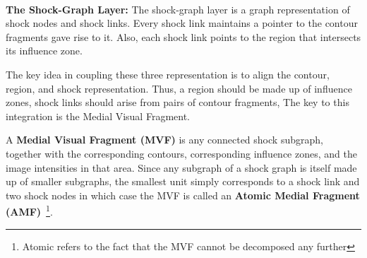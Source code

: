 \noindent\\
{\bf  The Shock-Graph Layer: } The shock-graph layer is a graph representation of shock nodes and shock links. Every shock link maintains a pointer to the contour fragments gave rise to it. Also, each shock link points to the region that intersects its influence zone. 

The key idea in coupling these three representation is to align the contour, region, and shock representation. Thus, a region should be made up of influence zones, shock links should arise from pairs of contour fragments, \etc The key to this integration is the Medial Visual Fragment.

\begin{definition}
A {\bf Medial Visual Fragment (MVF)} is any connected shock subgraph, together with the corresponding contours, corresponding influence zones, and the image intensities in that area. Since any subgraph of a shock graph is itself made up of smaller subgraphs, the smallest unit simply corresponds to a shock link and two shock nodes in which case the MVF is called an {\bf Atomic Medial Fragment (AMF)}~\footnote{Atomic refers to the fact that the MVF cannot be decomposed any further}. %
\end{definition}

